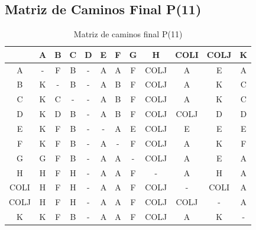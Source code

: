 \documentclass[12pt]{article}
\begin{document}
\subsection{Matriz de Caminos Final P(11)}
\begin{table}[h!]
\centering
\begin{tabular}{|c|c|c|c|c|c|c|c|c|c|c|c|}
\hline
 & A & B & C & D & E & F & G & H & COLI & COLJ & K \\\hline
A & - & F & B & - & A & A & F & COLJ & A & E & A \\\hline
B & K & - & B & - & A & B & F & COLJ & A & K & C \\\hline
C & K & C & - & - & A & B & F & COLJ & A & K & C \\\hline
D & K & D & B & - & A & B & F & COLJ & COLJ & D & D \\\hline
E & K & F & B & - & - & A & E & COLJ & E & E & E \\\hline
F & K & F & B & - & A & - & F & COLJ & A & K & F \\\hline
G & G & F & B & - & A & A & - & COLJ & A & E & A \\\hline
H & H & F & H & - & A & A & F & - & A & H & A \\\hline
COLI & H & F & H & - & A & A & F & COLJ & - & COLI & A \\\hline
COLJ & H & F & H & - & A & A & F & COLJ & COLJ & - & A \\\hline
K & K & F & B & - & A & A & F & COLJ & A & K & - \\\hline
\end{tabular}
\caption{Matriz de caminos final P(11)}
\end{table}

\clearpage
\end{document}
